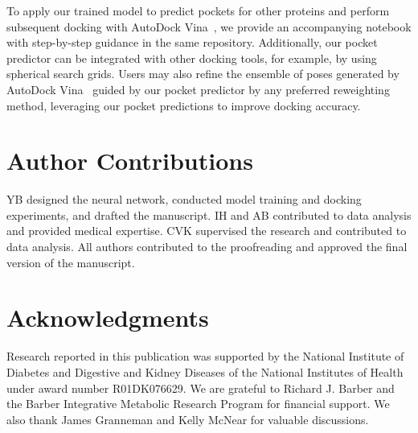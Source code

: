 \documentclass[10pt,conference]{IEEEtran}
\begin{document}
To apply our trained model to predict pockets for other proteins and perform subsequent docking with AutoDock Vina~\cite{eberhardt2021autodock}, we provide an accompanying notebook with step-by-step guidance in the same repository. Additionally, our pocket predictor can be integrated with other docking tools, for example, by using spherical search grids. Users may also refine the ensemble of poses generated by AutoDock Vina~\cite{eberhardt2021autodock} guided by our pocket predictor by any preferred reweighting method, leveraging our pocket predictions to improve docking accuracy.


\section*{Author Contributions}

YB designed the neural network, conducted model training and docking experiments, and drafted the manuscript. IH and AB contributed to data analysis and provided medical expertise. CVK supervised the research and contributed to data analysis. All authors contributed to the proofreading and approved the final version of the manuscript. 

\section*{Acknowledgments}
Research reported in this publication was supported by the National Institute of Diabetes and Digestive and Kidney Diseases of the National Institutes of Health under award number R01DK076629. We are grateful to Richard J. Barber and the Barber Integrative Metabolic Research Program for financial support. We also thank James Granneman and Kelly McNear for valuable discussions.



\end{document}
